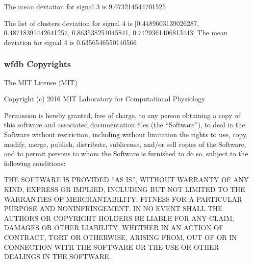 \documentclass[11pt]{article}
\begin{document}
The mean deviation for signal 3 is 9.073214544701525

The list of clusters deviation for signal 4 is {[}0.4489603139026287,
0.48718391442641257, 0.863538251045841, 0.7429361406813443{]} The mean
deviation for signal 4 is 0.6356546550140566

\hypertarget{wfdb-copyrights}{%
\subsubsection{wfdb Copyrights}\label{wfdb-copyrights}}

The MIT License (MIT)

Copyright (c) 2016 MIT Laboratory for Computational Physiology

Permission is hereby granted, free of charge, to any person obtaining a
copy of this software and associated documentation files (the
``Software''), to deal in the Software without restriction, including
without limitation the rights to use, copy, modify, merge, publish,
distribute, sublicense, and/or sell copies of the Software, and to
permit persons to whom the Software is furnished to do so, subject to
the following conditions:

THE SOFTWARE IS PROVIDED ``AS IS'', WITHOUT WARRANTY OF ANY KIND,
EXPRESS OR IMPLIED, INCLUDING BUT NOT LIMITED TO THE WARRANTIES OF
MERCHANTABILITY, FITNESS FOR A PARTICULAR PURPOSE AND NONINFRINGEMENT.
IN NO EVENT SHALL THE AUTHORS OR COPYRIGHT HOLDERS BE LIABLE FOR ANY
CLAIM, DAMAGES OR OTHER LIABILITY, WHETHER IN AN ACTION OF CONTRACT,
TORT OR OTHERWISE, ARISING FROM, OUT OF OR IN CONNECTION WITH THE
SOFTWARE OR THE USE OR OTHER DEALINGS IN THE SOFTWARE.
\end{document}
